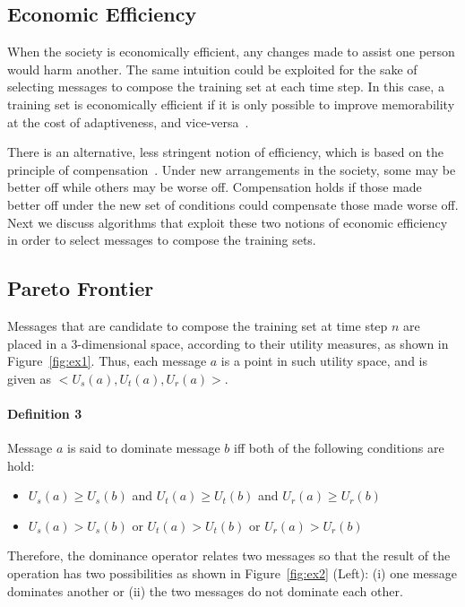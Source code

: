 \subsection{Economic Efficiency}

When the society is economically efficient, any changes made to assist one person would harm another. The same intuition could be exploited for the sake of selecting messages to compose the training set at each time step. In this case, a training set is economically efficient if it is only possible to improve memorability at the cost of adaptiveness, and vice-versa~\cite{recsys12,icmr14}.

There is an alternative, less stringent notion of efficiency, which is based on the principle of compensation~\cite{compensation}.
Under new arrangements in the society, some may be better off while others may be worse off.
Compensation holds if those made better off
under the new set of conditions could compensate those made worse off. Next we discuss algorithms that exploit these two notions of economic efficiency in order to select messages to compose the training sets.

\subsection*{Pareto Frontier}
Messages that are candidate to compose the training set at time step $n$ are placed in a 3-dimensional space, according to their utility measures, as shown in Figure~\ref{fig:ex1}.
Thus, each message $a$ is a point in such utility space, and is given as $<U_s(a),U_t(a),U_r(a)>$.

\paragraph*{\bf{Definition 3}} Message $a$ is said to dominate message $b$ iff both of the following conditions are hold:
\begin{itemize}
\item $U_s(a)\ge U_s(b)$ and $U_t(a)\ge U_t(b)$ and $U_r(a)\ge U_r(b)$
\item $U_s(a) > U_s(b)$ or $U_t(a) > U_t(b)$ or $U_r(a) > U_r(b)$
\end{itemize}
Therefore, the dominance operator relates two messages so that the result of the
operation has two possibilities as shown in Figure~\ref{fig:ex2} (Left): (i) one message dominates another or (ii) the two
messages do not dominate each other.

